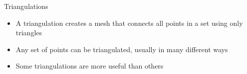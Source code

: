 \begin{frame}{Triangulations}
	\begin{itemize}
		\item A triangulation creates a mesh that connects all points in a set using only triangles
		\item Any set of points can be triangulated, usually in many different ways
		\item Some triangulations are more useful than others
	\end{itemize}
\end{frame}
